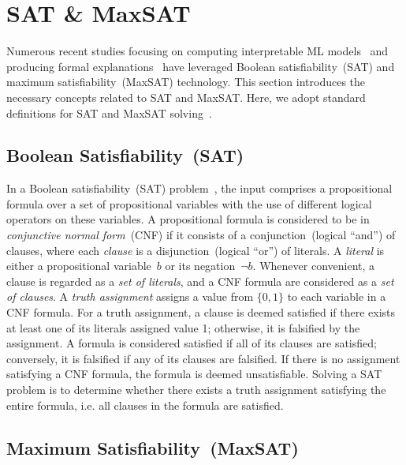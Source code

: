 \section{SAT \& MaxSAT} \label{sec:sat}
Numerous recent studies focusing on computing interpretable ML models~\cite{aaai2021e,ipnms-ijcar18} 
and producing formal explanations~\cite{iisms-aaai22,ims-sat21} have leveraged 
Boolean satisfiability~(SAT) and maximum satisfiability~(MaxSAT) technology. 
%
This section introduces the necessary concepts related to SAT and MaxSAT.
%
Here, we adopt standard definitions for SAT and MaxSAT solving~\cite{sat-handbook}.

\subsection{Boolean Satisfiability~(SAT)}

In a Boolean satisfiability~(SAT) problem~\cite{sat-handbook}, the input 
comprises a propositional formula over a set of propositional variables
with the use of different logical operators on these variables.
%
A propositional formula is considered to be in \emph{conjunctive normal form}~(CNF) 
if it consists of a conjunction~(logical ``and'') of clauses,
where each \emph{clause} is a disjunction~(logical ``or'') of literals. 
%
A \emph{literal} is either a propositional variable~$b$ or its negation~$\neg b$.
%
Whenever convenient, a clause is regarded as a \emph{set of literals}, 
and a CNF formula are considered as a \emph{set of clauses}.
%
A \emph{truth assignment} assigns a value from $\{0,1\}$ to each variable 
in a CNF formula.
%
For a truth assignment, a clause is deemed satisfied if there exists at least 
one of its literals assigned value 1; otherwise, it is falsified by 
the assignment.
%
A formula is considered satisfied if all of its clauses 
are satisfied; conversely, it is falsified if any of its 
clauses are falsified.
%
If there is no assignment satisfying a CNF formula, 
the formula is deemed unsatisfiable.
%
Solving a SAT problem is to determine whether there exists a truth assignment 
satisfying the entire formula, i.e. all clauses in the formula are satisfied.

\subsection{Maximum Satisfiability~(MaxSAT)}

